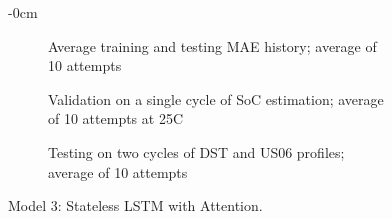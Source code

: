 \begin{figure}[H]
\begin{adjustwidth}{-\extralength}{0cm}
\begin{subfigure}[b]{0.425\textwidth}
        \caption{Average training and testing MAE history; average of 10 attempts}
    \end{subfigure}
    \hfill
    \begin{subfigure}[b]{0.425\textwidth}
        \centering
        
        \caption{Validation on a single cycle of SoC estimation; average of 10 attempts at 25\textdegree{}C}
    \end{subfigure}
    \hfill
    \begin{subfigure}[b]{0.425\textwidth}
        \centering
        
        \caption{Testing on two cycles of DST and US06 profiles; average of 10 attempts}
        \label{subfig:Model-3res-testing}
    \end{subfigure}
    \caption{Model 3: Stateless LSTM with Attention.}
    \label{fig:Model-3res}
    \end{adjustwidth}
\end{figure}
\clearpage
